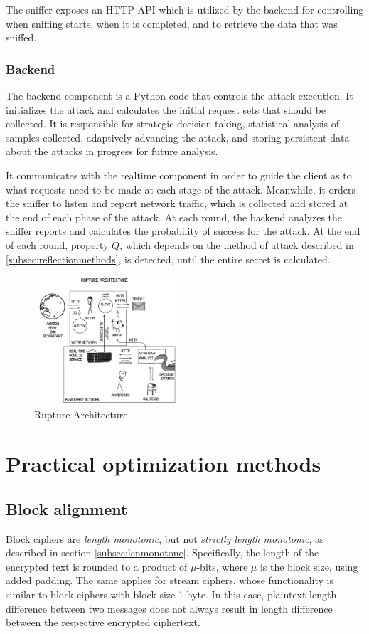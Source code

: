 \documentclass[conference, letterpaper, 10pt]{IEEEtran}
\begin{document}
The sniffer exposes an HTTP API which is utilized by the backend for controlling
when sniffing starts, when it is completed, and to retrieve the data that was
sniffed.

\subsubsection{Backend}

The backend component is a Python code that controls the attack execution. It
initializes the attack and calculates the initial request sets that should be
collected. It is responsible for strategic decision taking, statistical
analysis of samples collected, adaptively advancing the attack, and storing
persistent data about the attacks in progress for future analysis.

It communicates with the realtime component in order to guide the client as to
what requests need to be made at each stage of the attack. Meanwhile, it orders
the sniffer to listen and report network traffic, which is collected and stored
at the end of each phase of the attack. At each round, the backend analyzes the
sniffer reports and calculates the probability of success for the attack. At the
end of each round, property $Q$, which depends on the method of attack described
in \ref{subsec:reflectionmethods}, is detected, until the entire secret is
calculated.

   \begin{figure}[thpb]
      \centering
      \includegraphics[width=0.48\textwidth]{architecture.png}
      \caption{Rupture Architecture}
   \end{figure}

\section{Practical optimization methods}\label{app:optimization}

\subsection{Block alignment}\label{subsec:blockalign}
Block ciphers are \textit{length monotonic}, but not \textit{strictly length
monotonic}, as described in section \ref{subsec:lenmonotone}. Specifically, the
length of the encrypted text is rounded to a product of $\mu$-bits, where $\mu$
is the block size, using added padding. The same applies for stream ciphers,
whose functionality is similar to block ciphers with block size 1 byte. In this
case, plaintext length difference between two messages does not always result in
length difference between the respective encrypted ciphertext.
\end{document}
